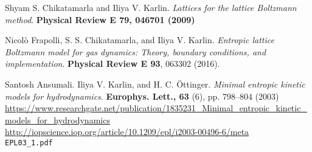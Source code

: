 \documentclass[twoside,landscape,10pt]{amsart}
\theoremstyle{plain}
\theoremstyle{definition}
\theoremstyle{remark}
\theoremstyle{remark}
\begin{document}
\begin{thebibliography}{9}
Shyam S. Chikatamarla and Iliya V. Karlin.  \emph{Lattices for the lattice Boltzmann method}.  \textbf{Physical Review E 79, 046701 (2009)}  
  
  Nicol\`{o} Frapolli, S. S. Chikatamarla, and Iliya V. Karlin.  \emph{Entropic lattice Boltzmann model for gas dynamics: Theory, boundary conditions, and implementation}.  \textbf{Physical Review E 93}, 063302 (2016).

Santosh	Ansumali.  Iliya V. Karlin, and H. C. \"{O}ttinger.  \emph{Minimal entropic kinetic models for hydrodynamics}.  \textbf{Europhys. Lett., 63} (6), pp. 798–804 (2003) \\
\url{https://www.researchgate.net/publication/1835231_Minimal_entropic_kinetic_models_for_hydrodynamics}   \\
\url{http://iopscience.iop.org/article/10.1209/epl/i2003-00496-6/meta} \\
\verb|EPL03_1.pdf|










\end{thebibliography}
\end{document}
